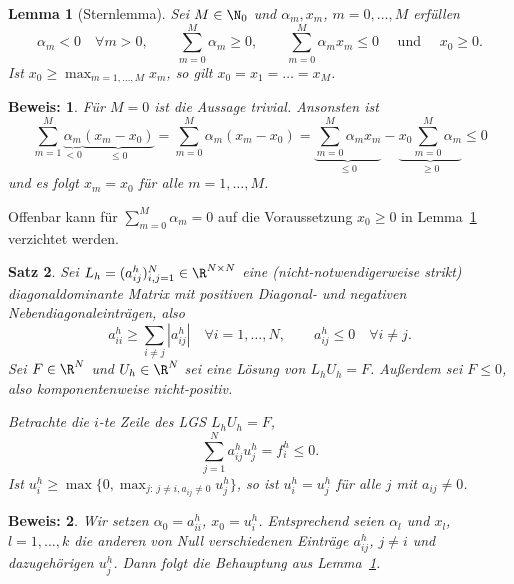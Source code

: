\documentclass[
]{mycourse}
\theoremstyle{mythm}
\newtheorem{theorem}{Satz}[chapter]
\newtheorem{lemma}[theorem]{Lemma}
\theoremstyle{break}
\newtheorem*{beweis}{Beweis:}
\begin{document}
\begin{lemma}[Sternlemma]\label{lemma:stern}
Sei $M\in \N_0$ und $\alpha_m,x_m$, $m=0,\ldots,M$ erfüllen
\[
\alpha_m<0 \quad \forall m>0,\qquad \sum_{m=0}^M \alpha_m\geq 0, \qquad
\sum_{m=0}^M \alpha_m x_m\leq 0 \quad \mbox{ und } \quad x_0\geq 0.
\]
Ist $x_0\geq \max_{m=1,\ldots,M} x_m$, so gilt $x_0=x_1=\ldots=x_M$.
\end{lemma}
\begin{beweis}
Für $M=0$ ist die Aussage trivial. Ansonsten ist
\[
\sum_{m=1}^M \underbrace{\alpha_m}_{< 0} \underbrace{(x_m - x_0)}_{\leq 0}=\sum_{m=0}^M \alpha_m (x_m - x_0)=\underbrace{\sum_{m=0}^M \alpha_m x_m}_{\leq 0} - \underbrace{x_0\sum_{m=0}^M\alpha_m}_{\geq 0}\leq 0
\]
und es folgt $x_m=x_0$ für alle $m=1,\ldots,M$.
\end{beweis}
Offenbar kann für $\sum_{m=0}^M\alpha_m=0$ auf die Voraussetzung $x_0\geq 0$ in Lemma~\ref{lemma:stern} verzichtet werden.

\begin{theorem}\label{thm:diskretes_maxprinzip}
Sei $L_h=(a^h_{ij})_{i,j=1}^N\in \R^{N\times N}$ eine (nicht-notwendigerweise strikt) diagonaldominante Matrix mit positiven Diagonal- und negativen 
Nebendiagonaleinträgen, also
\[
a^h_{ii}\geq \sum_{i\neq j} |a^h_{ij}|  \quad \forall i=1,\ldots,N, \qquad a^h_{ij}\leq 0 \quad \forall i\neq j.
\]
Sei $F\in \R^{N}$ und $U_h\in \R^N$ sei eine Lösung von $L_h U_h=F$. 
Außerdem sei $F\leq 0$, also komponentenweise nicht-positiv. 

Betrachte die $i$-te Zeile des LGS $L_h U_h =F$,
\[
\sum_{j=1}^N a^h_{ij} u^{h}_j =f^h_i\leq 0.
\]
Ist $u^h_i\geq \max\{0,\max_{j:\ j\neq i, a_{ij}\neq 0} u^h_j\}$, so 
ist $u^h_i=u^h_j$ für alle $j$ mit $a_{ij}\neq 0$.
\end{theorem}
\begin{beweis}
Wir setzen $\alpha_0=a^h_{ii}$, $x_0=u^h_i$. Entsprechend seien $\alpha_l$ und $x_l$, $l=1,\ldots,k$ die anderen
von Null verschiedenen Einträge $a^h_{ij}$, $j\neq i$ und dazugehörigen $u^h_j$. Dann folgt die Behauptung aus
Lemma~\ref{lemma:stern}.
\end{beweis}
\end{document}
